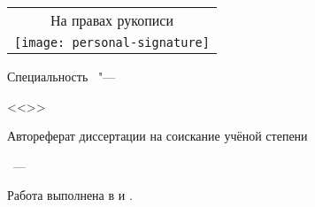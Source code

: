 
\thispagestyle{empty}


\noindent%
\begin{flushright}
	\begin{tabular}{@{}c@{}}
		\large
		На правах рукописи \\
		\texttt{[image: personal-signature]}
	\end{tabular}
\end{flushright}


\vspace{0pt plus2fill}
\begin{center}
	\Large \thesisAuthor
\end{center}


\vspace{0pt plus1fill}
\begin{center}
	\textbf {\Large \MakeUppercase \thesisTitle}
	
	\vspace{0pt plus1fill} 
	{\large Специальность \thesisSpecialtyNumber\ "---\par <<\thesisSpecialtyTitle>>}
	
	\vspace{0pt plus1fill} %
	\large{Автореферат диссертации на соискание учёной степени\par \thesisDegree}
\end{center}


\vspace{0pt plus4fill} 
{\large \centering\thesisCity~---~\thesisYear\par}


\newpage
\thispagestyle{empty}


\noindent%
Работа выполнена в {\thesisInFirstOrganization} и {\thesisInSecondOrganization}.


